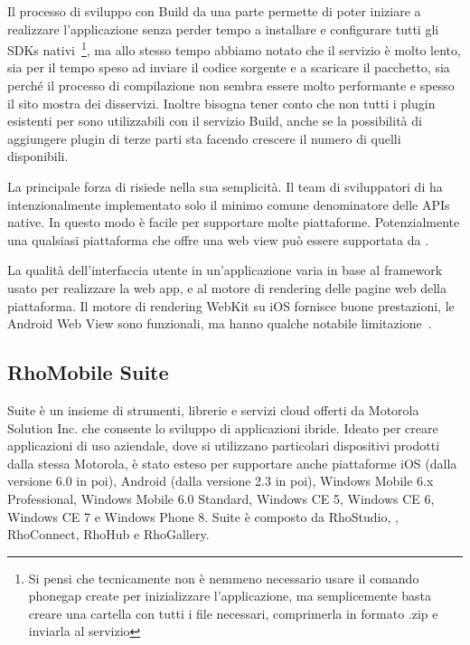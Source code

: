             Il processo di sviluppo con \pg{} Build da una parte permette di
            poter iniziare a realizzare l'applicazione senza perder tempo a
            installare e configurare tutti gli SDKs nativi~\footnote{Si pensi
            che tecnicamente non è nemmeno necessario usare il comando
            phonegap create per inizializzare l'applicazione, ma semplicemente
            basta creare una cartella con tutti i file necessari, comprimerla
            in formato .zip e inviarla al servizio}, ma allo stesso tempo
            abbiamo notato che il servizio è molto lento, sia per il tempo speso
            ad inviare il codice sorgente e a scaricare il pacchetto, sia perché
            il processo di compilazione non sembra essere molto performante e
            spesso il sito mostra
            dei disservizi. Inoltre bisogna tener conto che non tutti i plugin
            esistenti per \pg{} sono utilizzabili con il servizio
            \pg{} Build, anche se la possibilità di aggiungere plugin di terze
            parti sta facendo crescere il numero di quelli disponibili.

            La principale forza di \pg{} risiede nella sua semplicità.
            Il team di sviluppatori di \pg{} ha intenzionalmente implementato
            solo il minimo comune denominatore delle APIs native. In questo modo
            è facile per \pg{} supportare molte piattaforme. Potenzialmente
            una qualsiasi piattaforma che offre una web view può essere supportata
            da \pg{}.

            La qualità dell'interfaccia utente in un'applicazione \pg{}
            varia in base al frame\-work usato per realizzare la web app, e al
            motore di rendering delle pagine web della piattaforma.
            Il motore di rendering WebKit su iOS fornisce buone prestazioni, le
            Android Web View sono funzionali, ma hanno qualche notabile
            limitazione~\citep{Web:KevinSite}.


        \subsection{RhoMobile Suite}
            \rhom{} Suite è un insieme di strumenti, librerie e servizi cloud
            offerti da Motorola Solution Inc. che consente lo sviluppo di
            applicazioni ibride. Ideato per creare applicazioni di uso aziendale,
            dove si utilizzano particolari dispositivi prodotti dalla stessa
            Motorola, è stato esteso per supportare anche piattaforme iOS
            (dalla versione 6.0 in poi), Android (dalla versione 2.3 in poi),
            Windows Mobile 6.x Professional, Windows Mobile 6.0 Standard,
            Windows CE 5, Windows CE 6, Windows CE 7 e Windows Phone 8.
            \rhom{} Suite è composto da RhoStudio, \rhom{}, RhoConnect,
            RhoHub e RhoGallery.
